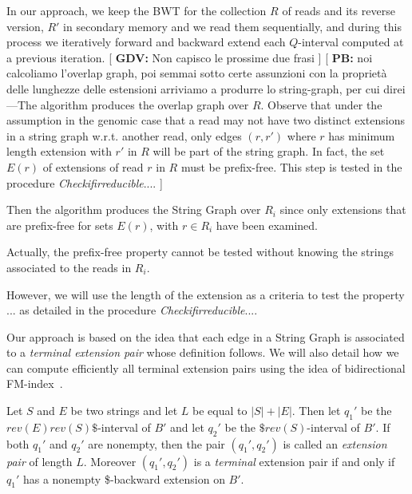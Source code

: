 \documentclass[runningheads,envcountsame,a4paper]{llncs}
\newcommand{\notaestesa}[2]{%
 \marginpar{\color{red!75!black}\textbf{\texttimes}}%
 {\color{red!75!black}%
 [\,\textbullet\,\textsf{\textbf{#1:}} %
 \textsf{\footnotesize#2}\,\textbullet\,]}%
}
\begin{document}
In our approach, we keep the BWT for the collection $R$ of reads and its
reverse version, $R'$ in secondary memory and we read them sequentially,
and during this process we iteratively forward and backward extend each
$Q$-interval computed at a previous iteration.
\notaestesa{GDV}{ Non capisco le prossime due frasi} \notaestesa{PB}{noi calcoliamo l'overlap graph, poi semmai sotto certe assunzioni
con la proprietà delle lunghezze delle estensioni arriviamo a produrre lo string-graph, per cui direi---The algorithm produces the overlap graph over $R$. Observe that under the assumption in the genomic case that
a read may not have two distinct extensions in a string graph  w.r.t. another  read, only  edges $(r,r')$  where $r$  has  minimum length   extension with
$r'$  in  $R$    will be part of the string graph.
In fact, the set $E(r)$ of extensions of read $r$ in $R$ must be prefix-free.
This step  is tested in the procedure
\emph{Checkifirreducible}....}

Then the algorithm produces the String Graph over $R_i$ since only
extensions that are prefix-free for sets $E(r)$, with $r \in R_i$ have
been examined.

Actually, the prefix-free property cannot be tested without knowing the
strings associated to the reads in $R_i$.

 However, we will use the length of the extension as a criteria to test
the property ... as detailed in the procedure
\emph{Checkifirreducible}....


Our approach is based on the idea that each edge in a String Graph is
associated to a \emph{terminal extension pair} whose definition follows.
We will also detail how we can compute efficiently all terminal extension pairs
using the idea of bidirectional FM-index~\cite{Lam2009}.

\begin{definition}\label{def:extension-pair}
Let $S$ and $E$ be two strings and let $L$ be equal to $|S|+|E|$.
Then let $q_{1}'$ be the $rev(E)rev(S)\$$-interval of $B'$ and let  $q_{2}'$ be the $\$rev(S)$-interval of $B'$.
If both $q_{1}'$ and  $q_{2}'$ are nonempty, then the pair  $(q_{1}', q_{2}')$ is called
an \emph{extension pair} of length $L$.
Moreover $(q_{1}', q_{2}')$ is a \emph{terminal} extension pair
if and only if $q_{1}'$ has a nonempty \$-backward extension on $B'$.
\end{definition}
\end{document}
